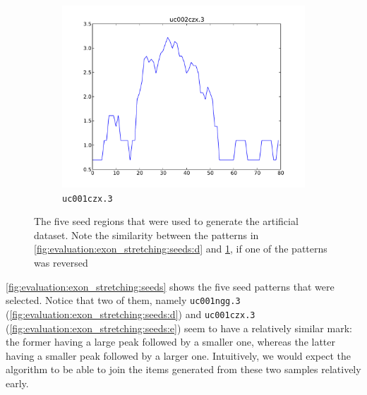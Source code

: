 \documentclass[parskip]{cs4rep}
\newcommand{\gene}[1]{{\tt #1}}
\begin{document}
\begin{figure}[t,b]
\begin{subfigure}[b]{0.3\textwidth}
        \centering
        \includegraphics[width=\textwidth]{figures/evaluation/exon_stretching/uc002czx_3.pdf}
        \caption{\gene{uc001czx.3}}
        \label{fig:evaluation:exon_stretching:seeds:e}
    \end{subfigure}
    \caption{The five seed regions that were used to generate the artificial dataset. Note the similarity between the patterns in \ref{fig:evaluation:exon_stretching:seeds:d} and \ref{fig:evaluation:exon_stretching:seeds:e}, if one of the patterns was reversed}
    \label{fig:evaluation:exon_stretching:seeds}
\end{figure}

\autoref{fig:evaluation:exon_stretching:seeds} shows the five seed patterns that were selected. 
Notice that two of them, namely \gene{uc001ngg.3} (\autoref{fig:evaluation:exon_stretching:seeds:d}) and \gene{uc001czx.3} (\autoref{fig:evaluation:exon_stretching:seeds:e}) seem to have a relatively similar mark: the former having a large peak followed by a smaller one, whereas the latter having a smaller peak followed by a larger one. Intuitively, we would expect the algorithm to be able to join the items generated from these two samples relatively early.
\end{document}
